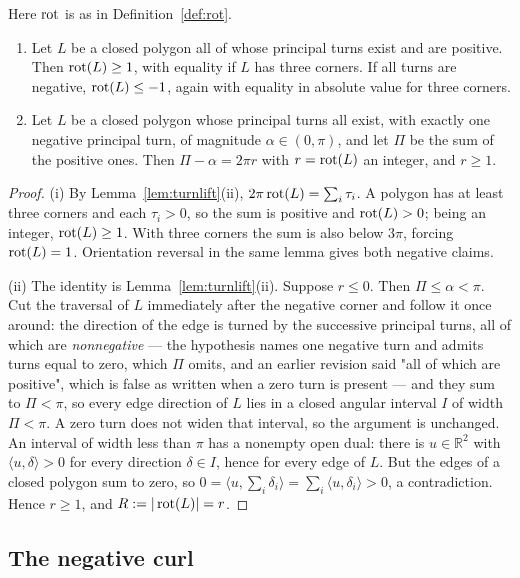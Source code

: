 \begin{lemma}
\label{lem:uniformrot}
Here $\operatorname{rot}$ is as in Definition~\ref{def:rot}.
\begin{enumerate}
\item[(i)] Let $L$ be a closed polygon all of whose principal turns exist and are
positive. Then $\operatorname{rot}(L)\geq1$, with equality if $L$ has three corners. If all
turns are negative, $\operatorname{rot}(L)\leq-1$, again with equality in absolute value for
three corners.
\item[(ii)] Let $L$ be a closed polygon whose principal turns all exist, with
exactly one negative principal turn, of magnitude $\alpha\in(0,\pi)$, and let
$\Pi$ be the sum of the positive ones. Then
$\Pi-\alpha=2\pi r$ with $r=\operatorname{rot}(L)$ an integer, and $r\geq1$.
\end{enumerate}
\end{lemma}
\begin{proof}
(i) By Lemma~\ref{lem:turnlift}(ii),
$2\pi\operatorname{rot}(L)=\sum_i\tau_i$. A polygon has at least three corners and each
$\tau_i>0$, so the sum is positive and $\operatorname{rot}(L)>0$; being an integer,
$\operatorname{rot}(L)\geq1$. With three corners the sum is also below $3\pi$, forcing
$\operatorname{rot}(L)=1$. Orientation reversal in the same lemma gives both negative
claims.

(ii) The identity is Lemma~\ref{lem:turnlift}(ii). Suppose $r\leq0$. Then
$\Pi\leq\alpha<\pi$. Cut the traversal of $L$ immediately after the negative
corner and follow it once around: the direction of the edge is turned by the
successive principal turns, all of which are \emph{nonnegative} --- the
hypothesis names one negative turn and admits turns equal to zero, which $\Pi$
omits, and an earlier revision said "all of which are positive", which is false
as written when a zero turn is present --- and they sum to $\Pi<\pi$, so every
edge direction of $L$ lies in a closed angular interval $I$ of width $\Pi<\pi$.
A zero turn does not widen that interval, so the argument is unchanged. An
interval of width less than $\pi$ has a nonempty open dual: there is
$u\in\mathbb R^2$ with $\langle u,\delta\rangle>0$ for every direction
$\delta\in I$, hence for every edge of $L$. But the edges of a closed polygon
sum to zero, so
$0=\langle u,\sum_i\delta_i\rangle=\sum_i\langle u,\delta_i\rangle>0$, a
contradiction. Hence $r\geq1$, and $R:=|\operatorname{rot}(L)|=r$.
\end{proof}

\subsection{The negative curl}

